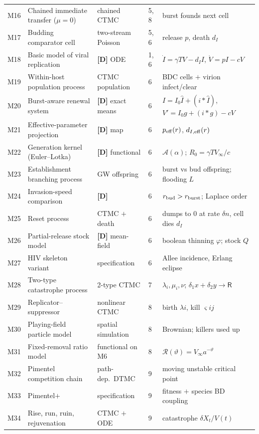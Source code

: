 \documentclass[11pt,a4paper]{article}
\newcommand{\Rst}{\mathsf{R}}       %
\begin{document}
{\begin{longtable}{@{}p{0.9cm}p{4.3cm}p{2.6cm}p{2.2cm}p{4.6cm}@{}}
\midrule
M16 & Chained immediate transfer ($\mu=0$) & chained CTMC & 5, 8 & burst founds next cell \\
M17 & Budding comparator cell & two-stream Poisson & 5, 6 & release $p$, death $d_I$ \\
\midrule
M18 & Basic model of viral replication & \textbf{[D]} ODE & 1, 6 & $\dot I=\gamma TV-d_II$, $\dot V=pI-cV$ \\
M19 & Within-host population process & CTMC population & 6 & BDC cells $+$ virion infect/clear \\
M20 & Burst-aware renewal system & \textbf{[D]} exact means & 6 & $I=I_0\hat I+(i*\hat I)$, $V'=I_0g+(i*g)-cV$ \\
M21 & Effective-parameter projection & \textbf{[D]} map & 6 & $p_{\rm eff}(r)$, $d_{I,\rm eff}(r)$ \\
M22 & Generation kernel (Euler--Lotka) & \textbf{[D]} functional & 6 & $\mathcal A(\alpha)$; $R_0=\gamma TV_\infty/c$ \\
M23 & Establishment branching process & GW offspring & 6 & burst vs bud offspring; flooding $L$ \\
M24 & Invasion-speed comparison & \textbf{[D]} & 6 & $r_{\rm bud}>r_{\rm burst}$; Laplace order \\
M25 & Reset process & CTMC $+$ death & 6 & dumps to $0$ at rate $\delta n$, cell dies $d_I$ \\
M26 & Partial-release stock model & \textbf{[D]} mean-field & 6 & boolean thinning $\varphi$; stock $Q$ \\
M27 & HIV skeleton variant & specification & 6 & Allee incidence, Erlang eclipse \\
\midrule
M28 & Two-type catastrophe process & 2-type CTMC & 7 & $\lambda_i,\mu_i,\nu$; $\delta_1x+\delta_2y\to\Rst$ \\
\midrule
M29 & Replicator--suppressor & nonlinear CTMC & 8 & birth $\lambda i$, kill $\varsigma ij$ \\
M30 & Playing-field particle model & spatial simulation & 8 & Brownian; killers used up \\
M31 & Fixed-removal ratio model & functional on M6 & 8 & $\mathcal R(\vartheta)=V_\infty a^{-\vartheta}$ \\
\midrule
M32 & Pimentel competition chain & path-dep.\ DTMC & 9 & moving unstable critical point \\
M33 & Pimentel$+$ & specification & 9 & fitness $+$ species BD coupling \\
M34 & Rise, run, ruin, rejuvenation & CTMC $+$ ODE & 9 & catastrophe $\delta X_t/V(t)$ \\

\end{longtable}}
\end{document}
